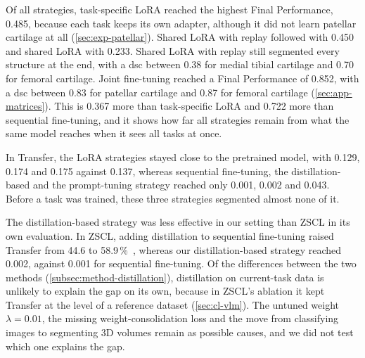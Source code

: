 Of all strategies, task-specific LoRA reached the highest Final Performance, 0.485, because each task keeps its own adapter, although it did not learn patellar cartilage at all (\cref{sec:exp-patellar}).
Shared LoRA with replay followed with 0.450 and shared LoRA with 0.233.
Shared LoRA with replay still segmented every structure at the end, with a \gls{dsc} between 0.38 for medial tibial cartilage and 0.70 for femoral cartilage.
Joint fine-tuning reached a Final Performance of 0.852, with a \gls{dsc} between 0.83 for patellar cartilage and 0.87 for femoral cartilage (\cref{sec:app-matrices}).
This is 0.367 more than task-specific LoRA and 0.722 more than sequential fine-tuning, and it shows how far all strategies remain from what the same model reaches when it sees all tasks at once.

In Transfer, the LoRA strategies stayed close to the pretrained model, with 0.129, 0.174 and 0.175 against 0.137, whereas sequential fine-tuning, the distillation-based and the prompt-tuning strategy reached only 0.001, 0.002 and 0.043.
Before a task was trained, these three strategies segmented almost none of it.

The distillation-based strategy was less effective in our setting than ZSCL in its own evaluation.
In ZSCL, adding distillation to sequential fine-tuning raised Transfer from 44.6 to 58.9\,\%~\cite[Table~2]{zheng2023preventingzeroshottransferdegradation}, whereas our distillation-based strategy reached 0.002, against 0.001 for sequential fine-tuning.
Of the differences between the two methods (\cref{subsec:method-distillation}), distillation on current-task data is unlikely to explain the gap on its own, because in ZSCL's ablation it kept Transfer at the level of a reference dataset (\cref{sec:cl-vlm}).
The untuned weight $\lambda = 0.01$, the missing weight-consolidation loss and the move from classifying images to segmenting 3D volumes remain as possible causes, and we did not test which one explains the gap.

